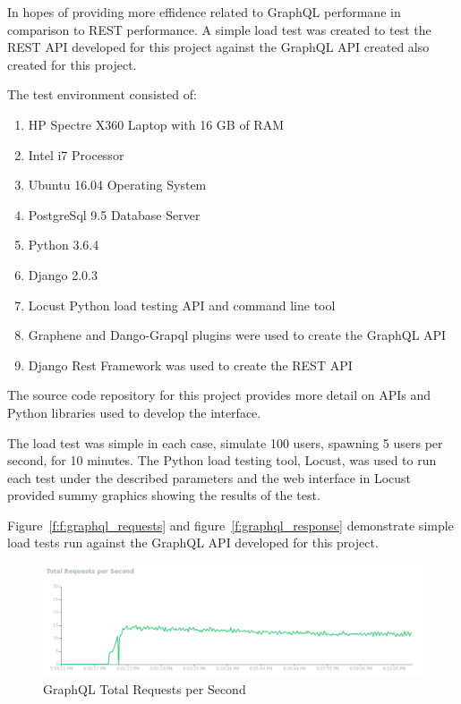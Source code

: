 In hopes of providing more effidence related to GraphQL performane in 
comparison to REST performance.  A simple load test was created to test 
the REST API developed for this project against the GraphQL API created also 
created for this project.

The test environment consisted of:
\begin{enumerate}
\item HP Spectre X360 Laptop with 16 GB of RAM
\item Intel i7 Processor
\item Ubuntu 16.04 Operating System
\item PostgreSql 9.5 Database Server
\item Python 3.6.4
\item Django 2.0.3
\item Locust Python load testing API and command line tool
\item Graphene and Dango-Grapql plugins were used to create the GraphQL API
\item Django Rest Framework was used to create the REST API
\end{enumerate}
The source code repository for this project provides more detail on APIs and 
Python libraries used to develop the interface.

The load test was simple in each case, simulate 100 users, spawning 5 users 
per second, for 10 minutes.  The Python load testing tool, Locust, was used 
to run each test under the described parameters and the web interface in 
Locust provided summy graphics showing the results of the test.

Figure~\ref{f:f:graphql_requests} and figure~\ref{f:graphql_response} 
demonstrate simple load tests run against the GraphQL API developed for this 
project.

\begin{figure}[htb]
  \centering\includegraphics[width=\columnwidth]
  {./images/graphql_requests.png}
  \caption{GraphQL Total Requests per Second}\label{f:graphql_requests}
\end{figure}

